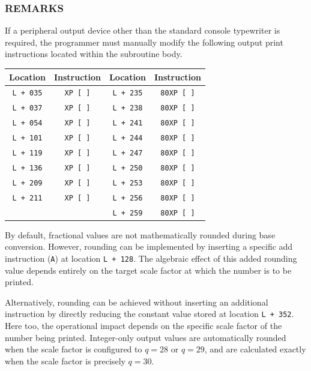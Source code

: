 \subsubsection*{REMARKS}
If a peripheral output device other than the standard console typewriter is required, the programmer must manually modify the following output print instructions located within the subroutine body.

\begin{center}
\begin{tabular}{cc|cc}
    \toprule
    \textbf{Location} & \textbf{Instruction} & \textbf{Location} & \textbf{Instruction} \\
    \midrule
    \texttt{L + 035}  & \texttt{XP [ ]}     & \texttt{L + 235}  & \texttt{80XP [ ]}   \\
    \texttt{L + 037}  & \texttt{XP [ ]}     & \texttt{L + 238}  & \texttt{80XP [ ]}   \\
    \texttt{L + 054}  & \texttt{XP [ ]}     & \texttt{L + 241}  & \texttt{80XP [ ]}   \\
    \texttt{L + 101}  & \texttt{XP [ ]}     & \texttt{L + 244}  & \texttt{80XP [ ]}   \\
    \texttt{L + 119}  & \texttt{XP [ ]}     & \texttt{L + 247}  & \texttt{80XP [ ]}   \\
    \texttt{L + 136}  & \texttt{XP [ ]}     & \texttt{L + 250}  & \texttt{80XP [ ]}   \\
    \texttt{L + 209}  & \texttt{XP [ ]}     & \texttt{L + 253}  & \texttt{80XP [ ]}   \\
    \texttt{L + 211}  & \texttt{XP [ ]}     & \texttt{L + 256}  & \texttt{80XP [ ]}   \\
    \textit{}         & \textit{}           & \texttt{L + 259}  & \texttt{80XP [ ]}   \\
    \bottomrule
\end{tabular}
\end{center}

By default, fractional values are not mathematically rounded during base conversion. However, rounding can be implemented by inserting a specific add instruction (\texttt{A}) at location \texttt{L + 128}. The algebraic effect of this added rounding value depends entirely on the target scale factor at which the number is to be printed. 

Alternatively, rounding can be achieved without inserting an additional instruction by directly reducing the constant value stored at location \texttt{L + 352}. Here too, the operational impact depends on the specific scale factor of the number being printed. Integer-only output values are automatically rounded when the scale factor is configured to $q=28$ or $q=29$, and are calculated exactly when the scale factor is precisely $q=30$.
\newpage
